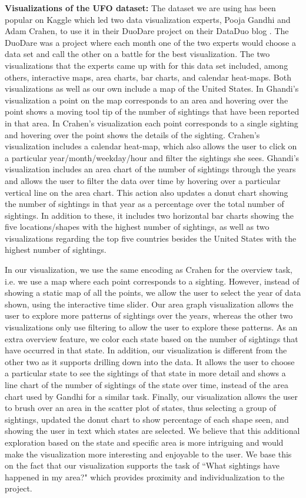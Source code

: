 \documentclass[journal]{vgtc}                %
\begin{document}
\textbf{Visualizations of the UFO dataset:}
The dataset we are using has been popular on Kaggle which led two data visualization experts, Pooja Gandhi and Adam Crahen, to use it in their DuoDare project on their DataDuo blog \cite{dataduo}. The DuoDare was a project where each month one of the two experts would choose a data set and call the other on a battle for the best visualization. The two visualizations that the experts came up with for this data set included, among others, interactive maps, area charts, bar charts, and calendar heat-maps. Both visualizations as well as our own include a map of the United States. In Ghandi's visualization a point on the map corresponds to an area and hovering over the point shows a moving tool tip of the number of sightings that have been reported in that area. In Crahen's visualization each point corresponds to a single sighting and hovering over the point shows the details of the sighting. Crahen's visualization includes a calendar heat-map, which also allows the user to click on a particular year/month/weekday/hour and filter the sightings she sees. Ghandi's visualization includes an area chart of the number of sightings through the years and allows the user to filter the data over time by hovering over a particular vertical line on the area chart. This action also updates a donut chart showing the number of sightings in that year as a percentage over the total number of sightings. In addition to these, it includes two horizontal bar charts showing the five locations/shapes with the highest number of sightings, as well as two visualizations regarding the top five countries besides the United States with the highest number of sightings. 

In our visualization, we use the same encoding as Crahen for the overview task, i.e. we use a map where each point corresponds to a sighting. However, instead of showing a static map of all the points, we allow the user to select the year of data shown, using the interactive time slider. Our area graph visualization allows the user to explore more patterns of sightings over the years, whereas the other two visualizations only use filtering to allow the user to explore these patterns. As an extra overview feature, we color each state based on the number of sightings that have occurred in that state. In addition, our visualization is different from the other two as it supports drilling down into the data. It allows the user to choose a particular state to see the sightings of that state in more detail and shows a line chart of the number of sightings of the state over time, instead of the area chart used by Gandhi for a similar task. Finally, our visualization allows the user to brush over an area in the scatter plot of states, thus selecting a group of sightings, updated the donut chart to show percentage of each shape seen, and showing the user in text which states are selected. We believe that this additional exploration based on the state and specific area is more intriguing and would make the visualization more interesting and enjoyable to the user. We base this on the fact that our visualization supports the task of ``What sightings have happened in my area?" which provides proximity and individualization to the project.
\end{document}
